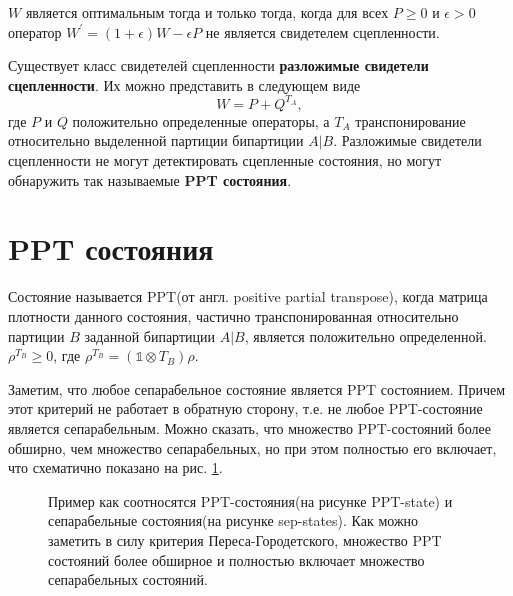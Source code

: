 \begin{theorem}
    $W$ является оптимальным тогда и только тогда, когда для всех $P \geq 0$ и $\epsilon > 0$ оператор $W^{'} = (1 + \epsilon)W - \epsilon P$ не является свидетелем сцепленности.
\end{theorem}

Существует класс свидетелей сцепленности \textbf{разложимые свидетели сцепленности}. Их можно представить в следующем виде
\begin{equation}\label{decomposal-ew-def}
    W = P + Q^{T_A},
\end{equation}
где $P$ и $Q$ положительно определенные операторы, а $T_A$ транспонирование относительно выделенной партиции бипартиции $A | B$.
Разложимые свидетели сцепленности не могут детектировать сцепленные состояния, но могут обнаружить так называемые \textbf{PPT состояния}.

\section{PPT состояния}
\begin{definition}
    Состояние называется PPT(от англ.  positive partial transpose), когда матрица плотности данного состояния, частично транспонированная относительно партиции $B$ заданной бипартиции $A | B$, является положительно определенной.
    $\rho^{T_B} \geq 0$, где $\rho^{T_B} = (\mathbb{1} \otimes T_B) \rho$.
\end{definition}
Заметим, что любое сепарабельное состояние является PPT состоянием.
Причем этот критерий не работает в обратную сторону, т.е. не любое PPT-состояние является сепарабельным. Можно сказать, что  множество PPT-состояний более обширно, чем множество сепарабельных, но при этом полностью его включает, что схематично показано на рис. \ref{ris:sep-and-ppt-states}.

\begin{figure}[h]
\caption{
Пример как соотносятся PPT-состояния(на рисунке PPT-state) и сепарабельные состояния(на рисунке sep-states). Как можно заметить в силу критерия Переса-Городетского, множество PPT состояний  более обширное и полностью включает множество сепарабельных состояний.
}
\label{ris:sep-and-ppt-states}
\end{figure}

